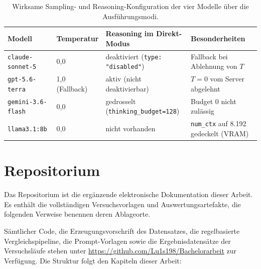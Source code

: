 \begin{table}[htbp]
    \centering
    \small
    \caption[Sampling- und Reasoning-Parameter der Modelle]{Wirksame Sampling- und Reasoning-Konfiguration der vier Modelle über die Ausführungsmodi.}
    \label{tab:apx-parameter}
    \begin{tabularx}{\textwidth}{@{}llXp{3.2cm}@{}}
        \toprule
        \textbf{Modell} & \textbf{Temperatur} & \textbf{Reasoning im Direkt-Modus} & \textbf{Besonderheiten} \\
        \midrule
        \texttt{claude-sonnet-5} & 0,0 & deaktiviert (\texttt{type: "disabled"}) & Fallback bei Ablehnung von $T$ \\
        \texttt{gpt-5.6-terra} & 1,0 (Fallback) & aktiv (nicht deaktivierbar) & $T=0$ vom Server abgelehnt \\
        \texttt{gemini-3.6-flash} & 0,0 & gedrosselt (\texttt{thinking\_budget=128}) & Budget 0 nicht zulässig \\
        \texttt{llama3.1:8b} & 0,0 & nicht vorhanden & \texttt{num\_ctx} auf 8.192 gedeckelt (VRAM) \\
        \bottomrule
    \end{tabularx}
\end{table}

\section{Repositorium}
\label{apx:repo}

Das Repositorium ist die ergänzende elektronische Dokumentation dieser Arbeit. Es enthält die vollständigen Versuchsvorlagen und Auswertungsartefakte, die folgenden Verweise benennen deren Ablageorte.

Sämtlicher Code, die Erzeugungsvorschrift des Datensatzes, die regelbasierte Vergleichspipeline, die Prompt-Vorlagen sowie die Ergebnisdatensätze der Versuchsläufe stehen unter
\url{https://github.com/Lu1s198/Bachelorarbeit} zur Verfügung. Die Struktur folgt den Kapiteln dieser Arbeit:

